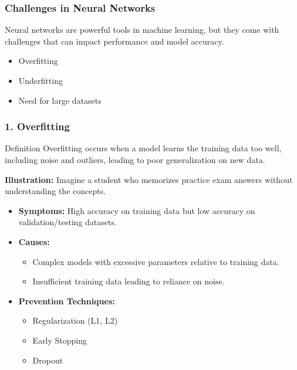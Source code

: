 \documentclass{beamer}
\begin{document}
\begin{frame}[fragile]
    \frametitle{Challenges in Neural Networks}
    Neural networks are powerful tools in machine learning, but they come with challenges that can impact performance and model accuracy. 
    \begin{itemize}
        \item Overfitting
        \item Underfitting
        \item Need for large datasets
    \end{itemize}
\end{frame}

\begin{frame}[fragile]
    \frametitle{1. Overfitting}
    \begin{block}{Definition}
        Overfitting occurs when a model learns the training data too well, including noise and outliers, leading to poor generalization on new data.
    \end{block}
    
    \textbf{Illustration:} Imagine a student who memorizes practice exam answers without understanding the concepts.

    \begin{itemize}
        \item \textbf{Symptoms:} High accuracy on training data but low accuracy on validation/testing datasets.
        \item \textbf{Causes:}
        \begin{itemize}
            \item Complex models with excessive parameters relative to training data.
            \item Insufficient training data leading to reliance on noise.
        \end{itemize}
        \item \textbf{Prevention Techniques:}
        \begin{itemize}
            \item Regularization (L1, L2)
            \item Early Stopping 
            \item Dropout
        \end{itemize}
    \end{itemize}
\end{frame}
\end{document}
